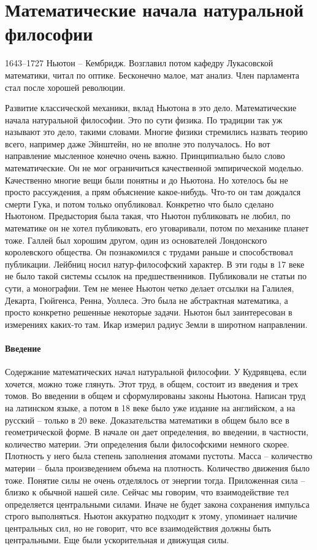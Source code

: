\documentclass[a4paper, 12pt]{article}
\begin{document}

\section{Математические начала натуральной философии}

1643--1727
Ньютон -- Кембридж. Возглавил потом кафедру Лукасовской математики, 
читал по оптике. Бесконечно малое, мат анализ. Член парламента стал 
после хорошей революции. 

Развитие классической механики, вклад Ньютона в это дело. 
Математические начала натуральной философии. Это по сути физика. По 
традиции так уж называют это дело, такими словами. Многие физики 
стремились назвать теорию всего, например даже Эйнштейн, но не вполне 
это получалось. Но вот направление мысленное конечно очень важно. 
Принципиально было слово математические. Он не мог ограничиться 
качественной эмпирической моделью. Качественно многие вещи были понятны 
и до Ньютона. Но хотелось бы не просто рассуждения, а прям объяснение 
какое-нибудь. Что-то он там дождался смерти Гука, и потом только 
опубликовал. Конкретно что было сделано Ньютоном. Предыстория была 
такая, что Ньютон публиковать не любил, по математике он не хотел 
публиковать, его уговаривали, потом по механике планет тоже. Галлей был 
хорошим другом, один из основателей Лондонского королевского общества. 
Он познакомился с трудами раньше и способствовал публикации. Лейбниц 
носил натур-философский характер. В эти годы в 17 веке не было такой 
системы ссылок на предшественников. Публиковали не статьи по сути, 
а монографии. Тем не менее Ньютон четко делает отсылки на Галилея, 
Декарта, Гюйгенса, Ренна, Уоллеса. Это была не абстрактная математика, 
а просто конкретно решенные некоторые задачи. Ньютон был заинтересован 
в измерениях каких-то там. Икар измерил радиус Земли в широтном 
направлении.

\paragraph{Введение}
Содержание математических начал натуральной философии. У Кудрявцева, 
если хочется, можно тоже глянуть. Этот труд, в общем, состоит из 
введения и трех томов. Во введении в общем и сформулированы законы 
Ньютона. Написан труд на латинском языке, а потом в 18 веке было уже 
издание на английском, а на русский -- только в 20 веке. Доказательства 
математики в общем было все в геометрической форме. В начале он дает 
определения, во введении, в частности, количество материи. Эти 
определения были философскими немного скорее. Плотность у него была 
степень заполнения атомами пустоты. Масса -- количество материи -- была 
произведением объема на плотность. Количество движения было тоже. 
Понятие силы не очень отделялось от энергии тогда. Приложенная сила -- 
близко к обычной нашей силе. Сейчас мы говорим, что взаимодействие тел 
определяется центральными силами. Иначе не будет закона сохранения 
импульса строго выполняться. Ньютон аккуратно подходит к этому, 
упоминает наличие центральных сил, но не говорит, что все взаимодействия 
должны быть центральными. Еще были ускорительная и движущая силы.
\end{document}

